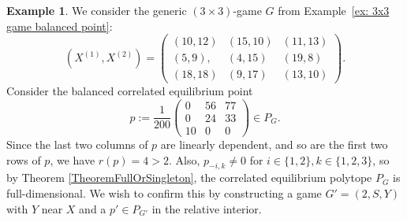 \documentclass[11pt]{amsart}
\theoremstyle{definition}
\newtheorem{example}[theorem]{Example}
\numberwithin{subcase}{case}
\begin{document}
\begin{example}
We consider the generic $(3 \times 3)$-game $G$ from Example~\ref{ex: 3x3 game balanced point}:
 \[ (X^{(1)},X^{(2)})= \begin{pmatrix}
    (10,12) & (15,10) & (11,13) \\
    (5,9), & (4,15) & (19,8) \\
    (18,18) & (9,17) & (13,10)
\end{pmatrix}.  \]
Consider the balanced correlated equilibrium point \[ p:= \frac{1}{200} \begin{pmatrix}
   0 & 56 & 77 \\
   0 & 24 & 33 \\
   10 & 0 & 0 
\end{pmatrix} \in P_G. \]  Since the last
two columns of $p$ are linearly dependent, and so are the first two
rows of $p$, we have $r(p)=4>2$. Also, $p_{-i,k} \neq 0$ for $i \in \{1,2\}, k \in
\{1,2,3\}$, so by Theorem \ref{TheoremFullOrSingleton}, the correlated
equilibrium polytope $P_G$ is full-dimensional. We wish to confirm this
by constructing a game $G'=(2,S,Y)$ with $Y$ near $X$ and a $p' \in P_{G'}$ in
the relative interior.


\end{example}
\end{document}
